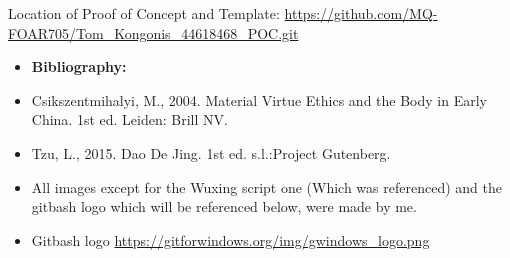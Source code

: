 \documentclass[unknownkeysallowed,usepdftitle=false, aspectratio=169, parskip=full]{beamer}
\newcommand{\secvariable}{nothing}
\newcommand{\mysection}[1]{\renewcommand{\secvariable}{#1}
}
\begin{document}
\begin{frame}\label{\secvariable}

%

Location of Proof of Concept and Template: \url{https://github.com/MQ-FOAR705/Tom_Kongonis_44618468_POC.git}

\vspace{5mm}

\begin{itemize}
\item{\textbf{Bibliography:}}
\item{Csikszentmihalyi, M., 2004. Material Virtue Ethics and the Body in Early China. 1st ed. Leiden: Brill NV.}

\item{Tzu, L., 2015. Dao De Jing. 1st ed. s.l.:Project Gutenberg.}
\item{All images except for the Wuxing script one (Which was referenced) and the gitbash logo which will be referenced below, were made by me.}
\item{Gitbash logo \url{https://gitforwindows.org/img/gwindows_logo.png}}
\end{itemize}

\end{frame}

\mysection{conclusion}
\end{document}
